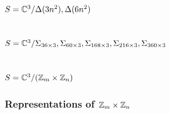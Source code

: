     \subsection{$S=\mathbb{C}^3/\Delta(3n^2),\Delta(6n^2)$}

    \subsection{$S=\mathbb{C}^3/\Sigma_{36\times 3},\Sigma_{60\times 3},\Sigma_{168\times 3},\Sigma_{216\times 3},\Sigma_{360\times 3}$}

    \subsection{$S=\mathbb{C}^3/(\mathbb{Z}_m\times\mathbb{Z}_n)$}

        \subsubsection{Representations of $\mathbb{Z}_m\times\mathbb{Z}_n$}

